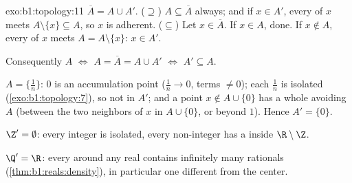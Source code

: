 \begin{solution}{exo:b1:topology:11}
$\overline A = A \cup A'$. ($\supseteq$) $A \subseteq \overline
A$ always; and if $x \in A'$, every  of $x$ meets $A
\setminus \{x\} \subseteq A$, so $x$ is adherent. ($\subseteq$)
Let $x \in \overline A$. If $x \in A$, done. If $x \notin A$,
every  of $x$ meets $A = A \setminus \{x\}$: $x \in
A'$.

Consequently $A$  $\iff$ $A = \overline A = A \cup A'$
$\iff$ $A' \subseteq A$.

$A = \{\frac 1n\}$: $0$ is an accumulation point ($\frac 1n \to
0$, terms $\neq 0$); each $\frac 1n$ is isolated
(\cref{exo:b1:topology:7}), so not in $A'$; and a point $x
\notin A \cup \{0\}$ has a whole  avoiding $A$ (between
the two neighbors of $x$ in $A \cup \{0\}$, or beyond $1$).
Hence $A' = \{0\}$.

$\Z' = \emptyset$: every integer is isolated, every non-integer
has a  inside $\R \setminus \Z$.

$\Q' = \R$: every  around any real contains infinitely
many rationals (\cref{thm:b1:reals:density}), in particular one
different from the center.
\end{solution}

